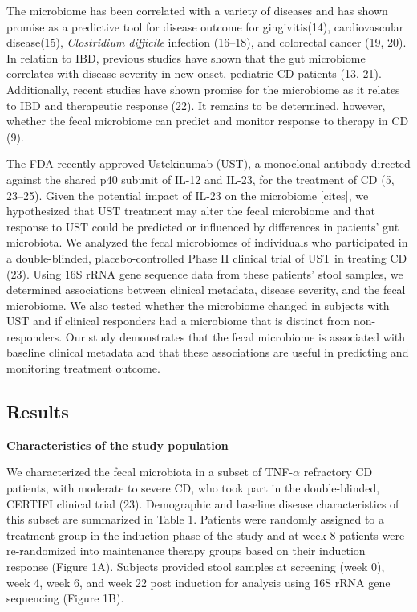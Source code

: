 \documentclass[11pt,]{article}
\begin{document}
The microbiome has been correlated with a variety of diseases and has
shown promise as a predictive tool for disease outcome for
gingivitis(14), cardiovascular disease(15), \emph{Clostridium difficile}
infection (16--18), and colorectal cancer (19, 20). In relation to IBD,
previous studies have shown that the gut microbiome correlates with
disease severity in new-onset, pediatric CD patients (13, 21).
Additionally, recent studies have shown promise for the microbiome as it
relates to IBD and therapeutic response (22). It remains to be
determined, however, whether the fecal microbiome can predict and
monitor response to therapy in CD (9).

The FDA recently approved Ustekinumab (UST), a monoclonal antibody
directed against the shared p40 subunit of IL-12 and IL-23, for the
treatment of CD (5, 23--25). Given the potential impact of IL-23 on the
microbiome {[}cites{]}, we hypothesized that UST treatment may alter the
fecal microbiome and that response to UST could be predicted or
influenced by differences in patients' gut microbiota. We analyzed the
fecal microbiomes of individuals who participated in a double-blinded,
placebo-controlled Phase II clinical trial of UST in treating CD (23).
Using 16S rRNA gene sequence data from these patients' stool samples, we
determined associations between clinical metadata, disease severity, and
the fecal microbiome. We also tested whether the microbiome changed in
subjects with UST and if clinical responders had a microbiome that is
distinct from non-responders. Our study demonstrates that the fecal
microbiome is associated with baseline clinical metadata and that these
associations are useful in predicting and monitoring treatment outcome.

\subsection{Results}\label{results}

\textbf{Characteristics of the study population}

We characterized the fecal microbiota in a subset of TNF-\({\alpha}\)
refractory CD patients, with moderate to severe CD, who took part in the
double-blinded, CERTIFI clinical trial (23). Demographic and baseline
disease characteristics of this subset are summarized in Table 1.
Patients were randomly assigned to a treatment group in the induction
phase of the study and at week 8 patients were re-randomized into
maintenance therapy groups based on their induction response (Figure
1A). Subjects provided stool samples at screening (week 0), week 4, week
6, and week 22 post induction for analysis using 16S rRNA gene
sequencing (Figure 1B).
\end{document}
